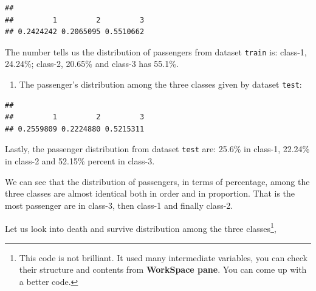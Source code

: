 \documentclass[
]{book}
\newenvironment{Shaded}{\begin{snugshade}}{\end{snugshade}}
\newcommand{\CommentTok}[1]{\textcolor[rgb]{0.56,0.35,0.01}{\textit{#1}}}
\newcommand{\KeywordTok}[1]{\textcolor[rgb]{0.13,0.29,0.53}{\textbf{#1}}}
\newcommand{\NormalTok}[1]{#1}
\newcommand{\OperatorTok}[1]{\textcolor[rgb]{0.81,0.36,0.00}{\textbf{#1}}}
\providecommand{\tightlist}{%
  \setlength{\itemsep}{0pt}\setlength{\parskip}{0pt}}
\begin{document}
\begin{Shaded}
\end{Shaded}

\begin{verbatim}
## 
##         1         2         3 
## 0.2424242 0.2065095 0.5510662
\end{verbatim}

The number tells us the distribution of passengers from dataset \texttt{train} is: class-1, 24.24\%; class-2, 20.65\% and class-3 has 55.1\%.

\begin{enumerate}
\def\labelenumi{\arabic{enumi}.}
\setcounter{enumi}{2}
\tightlist
\item
  The passenger's distribution among the three classes given by dataset \texttt{test}:
\end{enumerate}

\begin{Shaded}
\end{Shaded}

\begin{verbatim}
## 
##         1         2         3 
## 0.2559809 0.2224880 0.5215311
\end{verbatim}

Lastly, the passenger distribution from dataset \texttt{test} are: 25.6\% in class-1, 22.24\% in class-2 and 52.15\% percent in class-3.

We can see that the distribution of passengers, in terms of percentage, among the three classes are almost identical both in order and in proportion. That is the most passenger are in class-3, then class-1 and finally class-2.

Let us look into death and survive distribution among the three classes\footnote{This code is not brilliant. It used many intermediate variables, you can check their structure and contents from \textbf{WorkSpace pane}. You can come up with a better code.},
\end{document}
